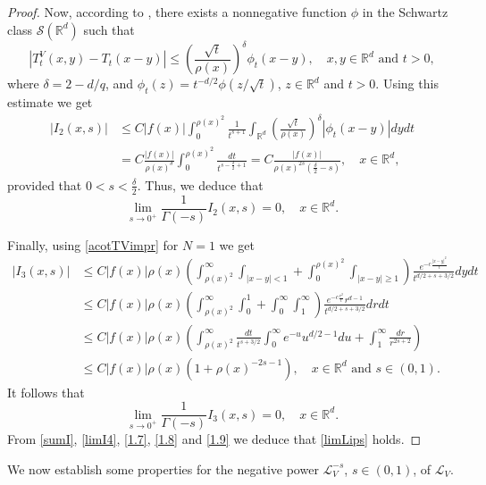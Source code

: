 \documentclass[10pt, a4paper, reqno]{amsart}
\theoremstyle{definition}
\theoremstyle{remark}
\numberwithin{equation}{section}
\begin{document}
\begin{proof}
Now, according to \cite[Proposition 2.16]{DzZ3}, there exists a nonnegative function $\phi$ in the Schwartz class $\mathcal S(\mathbb R^d)$ such that 
\begin{equation}\label{TtVTt}
|T_t^V(x,y)-T_t(x-y)|\leq \left(\frac{\sqrt{t}}{\rho (x)}\right)^\delta \phi _t(x-y),\quad x,y\in \mathbb R^d\mbox{ and }t>0,
\end{equation}
where $\delta =2-d/q$, and $\phi_t(z)=t^{-d/2}\phi (z/\sqrt{t})$, $z\in \mathbb R^d$ and $t>0$.
Using this estimate we get
\begin{align*}
|I_2(x,s)|&\leq C|f(x)|\int_0^{\rho (x)^2}\frac{1}{t^{s+1}}\int_{\mathbb R^d}\left(\frac{\sqrt{t}}{\rho (x)}\right)^\delta |\phi _t(x-y)|dydt\nonumber\\
&=C\frac{|f(x)|}{\rho (x)^\delta}\int_0^{\rho (x)^2}\frac{dt}{t^{s -\tfrac{\delta}{2}+1}}=C\frac{|f(x)|}{\rho (x)^{2s}(\tfrac{\delta}{2}-s)},\quad x\in \mathbb R^d,
\end{align*}
provided that $0<s<\tfrac{\delta}{2}$. 
Thus, we deduce that
\begin{equation}\label{1.8}
\lim_{s\rightarrow 0^+}\frac{1}{\Gamma (-s)}I_2(x,s)=0,\quad x\in \mathbb R^d.
\end{equation}

Finally, using \eqref{acotTVimpr} for $N=1$ we get
\begin{align*}
|I_3(x,s)|&\leq C|f(x)|\rho (x)\left(\int_{\rho (x)^2}^\infty\int_{|x-y|<1}+\int_0^{\rho (x)^2}\int_{|x-y|\geq 1}\right)\frac{e^{-c\frac{|x-y|^2}{t}}}{t^{d/2+s+3/2}}dydt\\
&\leq  C|f(x)|\rho (x)\left(\int_{\rho (x)^2}^\infty \int_0^1
+\int_0^\infty \int_1^\infty \right)\frac{e^{-c\frac{r^2}{t}}r^{d-1}}{t^{d/2+s+3/2}}drdt\\
&\leq C|f(x)|\rho (x)\left(\int_{\rho (x)^2}^\infty \frac{dt}{t^{s+3/2}}\int_0^\infty e^{-u}u^{d/2-1}du+\int_1^\infty \frac{dr}{r^{2s+2}}\right)\\
&\leq C|f(x)|\rho (x)\left(1+\rho (x)^{-2s-1}\right),\quad x\in \mathbb R^d\mbox{ and }s\in (0,1).
\end{align*}
It follows that
\begin{equation}\label{1.9}
\lim_{s\rightarrow 0^+}\frac{1}{\Gamma (-s)}I_3(x,s)=0,\quad x\in \mathbb R^d.
\end{equation}
From \eqref{sumI}, \eqref{limI4}, \eqref{1.7}, \eqref{1.8} and \eqref{1.9} we deduce that \eqref{limLips} holds.   
\end{proof}

We now establish some properties for the negative power $\mathcal{L}_V^{-s}$, $s\in (0,1)$, of $\mathcal{L}_V$.
\end{document}
